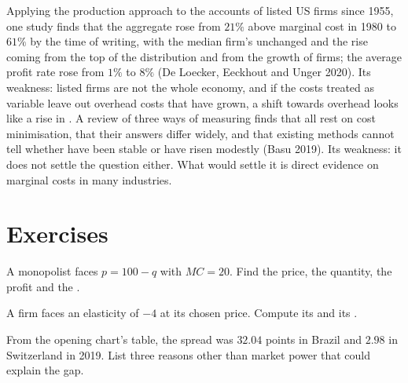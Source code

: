 \begin{debate}
Applying the production approach to the accounts of listed US firms since
1955, one study finds that the aggregate  rose from $21\%$ above
marginal cost in 1980 to $61\%$ by the time of writing, with the median firm's  unchanged and the
rise coming from the top of the distribution and from the growth of
 firms; the average profit rate rose from $1\%$ to $8\%$ (De Loecker,
Eeckhout and Unger 2020). %
Its weakness: listed firms are not the whole economy, and if the costs
treated as variable leave out overhead costs that have grown, a shift
towards overhead looks like a rise in . A review of three ways of measuring  finds
that all rest on cost minimisation, that their answers differ widely, and
that existing methods cannot tell whether  have been stable or have
risen modestly (Basu 2019). %
Its weakness: it does not settle the question either. What would settle it
is direct evidence on marginal costs in many industries.
\end{debate}

\section*{Exercises}\label{sec:b1:monopoly-pricing:exercises}

\begin{exercise}[$\star$]\label{exo:b1:monopoly-pricing:basic}
A monopolist faces $p = 100 - q$ with $MC = 20$. Find the price, the quantity,
the profit and the .
\end{exercise}

\begin{exercise}[$\star$]\label{exo:b1:monopoly-pricing:lerner-ex}
A firm faces an elasticity of $-4$ at its chosen price. Compute its  and its .
\end{exercise}

\begin{exercise}[$\star$]\label{exo:b1:monopoly-pricing:read}
From the opening chart's table, the spread was $32.04$ points in Brazil and
$2.98$ in Switzerland in 2019. %
List three reasons other than market power that could explain the gap.
\end{exercise}

